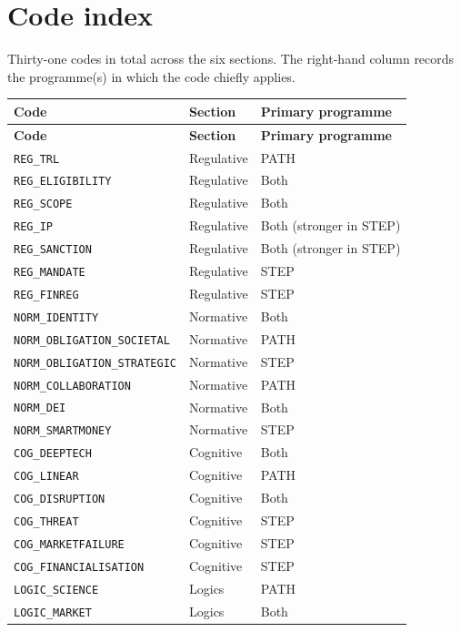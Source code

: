 \section*{Code index}

Thirty-one codes in total across the six sections. The right-hand
column records the programme(s) in which the code chiefly applies.

\begin{longtable}{@{} l l l @{}}
\toprule
\textbf{Code} & \textbf{Section} & \textbf{Primary programme} \\
\midrule
\endfirsthead
\toprule
\textbf{Code} & \textbf{Section} & \textbf{Primary programme} \\
\midrule
\endhead
\bottomrule
\endfoot
\texttt{REG\_TRL} & Regulative & PATH \\
\texttt{REG\_ELIGIBILITY} & Regulative & Both \\
\texttt{REG\_SCOPE} & Regulative & Both \\
\texttt{REG\_IP} & Regulative & Both (stronger in STEP) \\
\texttt{REG\_SANCTION} & Regulative & Both (stronger in STEP) \\
\texttt{REG\_MANDATE} & Regulative & STEP \\
\texttt{REG\_FINREG} & Regulative & STEP \\
\texttt{NORM\_IDENTITY} & Normative & Both \\
\texttt{NORM\_OBLIGATION\_SOCIETAL} & Normative & PATH \\
\texttt{NORM\_OBLIGATION\_STRATEGIC} & Normative & STEP \\
\texttt{NORM\_COLLABORATION} & Normative & PATH \\
\texttt{NORM\_DEI} & Normative & Both \\
\texttt{NORM\_SMARTMONEY} & Normative & STEP \\
\texttt{COG\_DEEPTECH} & Cognitive & Both \\
\texttt{COG\_LINEAR} & Cognitive & PATH \\
\texttt{COG\_DISRUPTION} & Cognitive & Both \\
\texttt{COG\_THREAT} & Cognitive & STEP \\
\texttt{COG\_MARKETFAILURE} & Cognitive & STEP \\
\texttt{COG\_FINANCIALISATION} & Cognitive & STEP \\
\texttt{LOGIC\_SCIENCE} & Logics & PATH \\
\texttt{LOGIC\_MARKET} & Logics & Both \\

\end{longtable}
